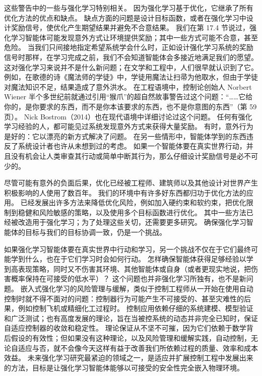 \documentclass[UTF8,12pt,a4paper,fontset=fandol]{ctexart}
\begin{document}
这些警告中的一些与强化学习特别相关。
因为强化学习基于优化，它继承了所有优化方法的优点和缺点。
缺点方面的问题是设计目标函数，或者在强化学习中设计奖励信号，使优化产生期望结果并避免不合意结果。
我们在第 17.4 节说过，强化学习智能体可能发现意外方式让环境提供奖励；其中一些方式可能不合意，甚至危险。
当我们只间接地指定希望系统学会什么时，正如设计强化学习系统的奖励信号时那样，在学习完成之前，我们不会知道智能体会多接近地满足我们的愿望。
这对强化学习来说并不是什么新问题；在文学和工程中，人们很早就认识到了它。
例如，在歌德的诗《魔法师的学徒》中，学徒用魔法让扫帚为他取水，但由于学徒对魔法知识不足，结果造成了意外洪水。
在工程语境中，控制论创始人 Norbert Wiener 半个多世纪前就通过引用“猴爪”的超自然故事警告过这个问题：“……它给你的，是你要求的东西，而不是你本该要求的东西，也不是你意图的东西”（第 59 页）。
Nick Bostrom（2014）也在现代语境中详细讨论过这个问题。
任何有强化学习经验的人，都可能见过系统发现意外方式来获得大量奖励。
有时，意外行为是好的：它以漂亮的新方式解决了问题。
在另一些情形中，智能体学到的东西违反了系统设计者也许从未想到过的考虑。
如果一个智能体要在真实世界行动，并且没有机会让人类审查其行动或简单中断其行为，那么仔细设计奖励信号是必不可少的。

尽管可能有意外的负面后果，优化已经被工程师、建筑师以及其他设计对世界产生积极影响的人使用了数百年。
我们的环境中有许多好东西都归功于优化方法的应用。
已经发展出许多方法来降低优化风险，例如加入硬约束和软约束，把优化限制到稳健和风险敏感的策略，以及使用多个目标函数进行优化。
其中一些方法已经被改造用于强化学习；为了处理这些关切，还需要更多研究。
确保强化学习智能体的目标与我们的目标协调一致，仍是一个挑战。

如果强化学习智能体要在真实世界中行动和学习，另一个挑战不仅在于它们最终可能学到什么，也在于它们学习时会如何行动。
怎样确保智能体获得足够经验以学到高表现策略，同时又不伤害其环境、其他智能体或自身（或者更现实地说，把伤害概率保持在可接受的低水平）？
这个问题也并非强化学习所独有，也不是新问题。
嵌入式强化学习的风险管理与缓解，类似于控制工程师从一开始在使用自动控制时就不得不面对的问题：控制器行为可能产生不可接受的、甚至灾难性的后果，例如控制飞机或精细化工过程时。
控制应用依赖仔细的系统建模、模型验证和广泛测试；也有高度发展的理论，旨在当被控系统的动态并非完全已知时，保证自适应控制器的收敛和稳定性。
理论保证从不坚不可摧，因为它们依赖于数学背后假设的有效性；但如果没有这种理论，以及风险管理和缓解实践，自动控制，无论自适应与否，就不会像今天这样有益于改善我们所依赖过程的质量、效率和成本效益。
未来强化学习研究最紧迫的领域之一，是适应并扩展控制工程中发展出来的方法，目标是让强化学习智能体能够以可接受的安全性完全嵌入物理环境。
\end{document}
